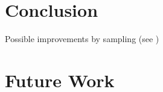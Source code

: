 \chapter{Conclusion}
Possible improvements by sampling (see \cite{opticsankerst1999optics})

\chapter{Future Work}